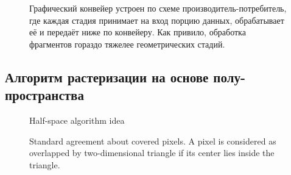 \documentclass[12pt,subf,href,colorlinks=true]{article}
\begin{document}
\begin{figure}[h]
	\caption{Графический конвейер устроен по схеме производитель-потребитель, где каждая стадия принимает на вход порцию данных, обрабатывает её и передаёт ниже по конвейеру. Как привило, обработка фрагментов гораздо тяжелее геометрических стадий.}
	\label{fig:prodcons}
\end{figure}

\subsection{Алгоритм растеризации на основе полу-пространства}

\begin{figure}[htb]
	\caption{Half-space algorithm idea}
	\label{fig:halfspace}
\end{figure}

\begin{figure}[htb]
	\caption{Standard agreement about covered pixels.  A pixel is considered as overlapped by two-dimensional triangle if its center lies inside the triangle.}
	\label{fig:coveragetest}
\end{figure}
\end{document}
